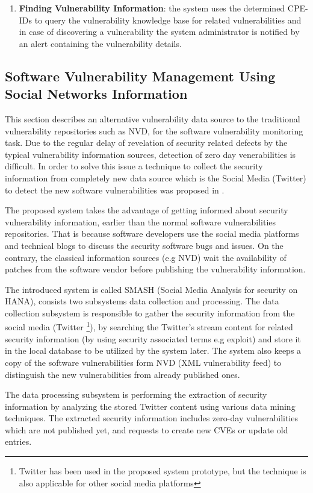 \documentclass{llncs}
\begin{document}
\begin{enumerate}
   \item \textbf{Finding Vulnerability Information}: the system uses the determined CPE-IDs to query the vulnerability knowledge base for related vulnerabilities and in case of discovering a vulnerability  the system administrator is notified by an alert containing the vulnerability details.      
   
 
 \end{enumerate}

\subsection{Software	Vulnerability	Management	Using	Social	Networks	Information	}

\par This section describes an alternative vulnerability data source to the traditional vulnerability repositories such as NVD, for the software vulnerability monitoring task. Due to the regular delay of revelation of security related defects by the typical vulnerability information sources,  detection of zero day venerabilities is difficult.  In order to solve this issue a technique to collect the security information from completely new data source which is the Social Media (Twitter) to detect the new software vulnerabilities was proposed in \cite{paper2}.

\par
The proposed system takes the advantage of getting informed about security vulnerability information, earlier than the normal software vulnerabilities repositories. That is because software developers use the social media platforms and technical blogs to discuss the security software bugs and issues. On the contrary, the classical information sources (e.g NVD) wait the availability of patches from the software vendor before publishing the vulnerability information.

\par The introduced system is called SMASH (Social Media Analysis for security on HANA), consists two subsystems data collection and processing. The data collection subsystem is responsible to gather the security information from the social media (Twitter \footnote{Twitter has been used in the proposed system prototype, but the technique is also applicable for other social media platforms}), by searching the Twitter's stream content for related security information (by using security associated terms e.g exploit) and store it in the local database to be utilized by the system later. The system also keeps a copy of the software vulnerabilities form NVD (XML vulnerability feed) to distinguish the new  vulnerabilities from already published ones.
\par
The data processing subsystem is performing the extraction of security information by analyzing the stored Twitter content using various data mining techniques. The extracted security information 
includes zero-day vulnerabilities which are not published yet, and requests to create new CVEs or update old entries.
\end{document}
